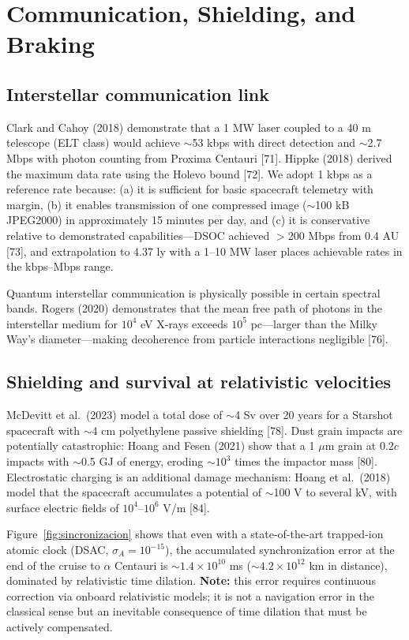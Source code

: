 \documentclass[11pt,a4paper,onecolumn]{article}
\begin{document}
\section{Communication, Shielding, and Braking}

\subsection{Interstellar communication link}

Clark and Cahoy (2018) demonstrate that a 1 MW laser coupled to a 40 m telescope (ELT class) would achieve $\sim$53 kbps with direct detection and $\sim$2.7 Mbps with photon counting from Proxima Centauri [71]. Hippke (2018) derived the maximum data rate using the Holevo bound [72]. We adopt 1 kbps as a reference rate because: (a) it is sufficient for basic spacecraft telemetry with margin, (b) it enables transmission of one compressed image ($\sim$100 kB JPEG2000) in approximately 15 minutes per day, and (c) it is conservative relative to demonstrated capabilities---DSOC achieved $>$200 Mbps from 0.4 AU [73], and extrapolation to 4.37 ly with a 1--10 MW laser places achievable rates in the kbps--Mbps range.

Quantum interstellar communication is physically possible in certain spectral bands. Rogers (2020) demonstrates that the mean free path of photons in the interstellar medium for $10^4$ eV X-rays exceeds $10^5$ pc---larger than the Milky Way's diameter---making decoherence from particle interactions negligible [76].

\subsection{Shielding and survival at relativistic velocities}

McDevitt et al.\ (2023) model a total dose of $\sim$4 Sv over 20 years for a Starshot spacecraft with $\sim$4 cm polyethylene passive shielding [78]. Dust grain impacts are potentially catastrophic: Hoang and Fesen (2021) show that a 1 $\mu$m grain at $0.2c$ impacts with $\sim$0.5 GJ of energy, eroding $\sim10^3$ times the impactor mass [80]. Electrostatic charging is an additional damage mechanism: Hoang et al.\ (2018) model that the spacecraft accumulates a potential of $\sim$100 V to several kV, with surface electric fields of $10^4$--$10^6$ V/m [84].

Figure~\ref{fig:sincronizacion} shows that even with a state-of-the-art trapped-ion atomic clock (DSAC, $\sigma_A=10^{-15}$), the accumulated synchronization error at the end of the cruise to $\alpha$ Centauri is $\sim1.4\times10^{10}$ ms ($\sim4.2\times10^{12}$ km in distance), dominated by relativistic time dilation. \textbf{Note:} this error requires continuous correction via onboard relativistic models; it is not a navigation error in the classical sense but an inevitable consequence of time dilation that must be actively compensated.
\end{document}
